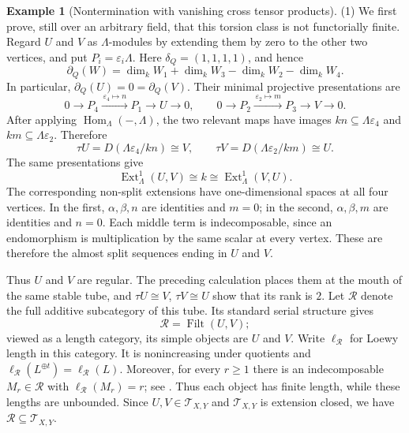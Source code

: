\documentclass[11pt,reqno]{amsart}
\theoremstyle{definition}
\newtheorem{example}[theorem]{Example}
\theoremstyle{remark}
\newcommand{\Ext}{\operatorname{Ext}}
\newcommand{\Hom}{\operatorname{Hom}}
\numberwithin{equation}{section}
\begin{document}
\begin{example}[Nontermination with vanishing cross tensor products]
\textup{(1)} We first prove, still over an arbitrary field, that this torsion
class is not functorially finite.  Regard $U$ and $V$ as $\Lambda$-modules by
extending them by zero to the other two vertices, and put
$P_i=\varepsilon_i\Lambda$.  Here $\delta_Q=(1,1,1,1)$, and hence
\[
 \partial_Q(W)=
 \dim_kW_1+\dim_kW_3-\dim_kW_2-\dim_kW_4.
\]
In particular, $\partial_Q(U)=0=\partial_Q(V)$.  Their minimal projective
presentations are
\[
 0\longrightarrow P_4\xrightarrow{\,\varepsilon_4\mapsto n\,}P_1
   \longrightarrow U\longrightarrow0,
 \qquad
 0\longrightarrow P_2\xrightarrow{\,\varepsilon_2\mapsto m\,}P_3
   \longrightarrow V\longrightarrow0.
\]
After applying $\Hom_\Lambda(-,\Lambda)$, the two relevant maps have images
$kn\subseteq\Lambda\varepsilon_4$ and
$km\subseteq\Lambda\varepsilon_2$.  Therefore
\[
 \tau U=D(\Lambda\varepsilon_4/kn)\cong V,
 \qquad
 \tau V=D(\Lambda\varepsilon_2/km)\cong U.
\]
The same presentations give
\[
 \Ext^1_\Lambda(U,V)\cong k
 \cong\Ext^1_\Lambda(V,U).
\]
The corresponding non-split extensions have one-dimensional spaces at all
four vertices.  In the first, $\alpha,\beta,n$ are identities and $m=0$;
in the second, $\alpha,\beta,m$ are identities and $n=0$.  Each middle term
is indecomposable, since an endomorphism is multiplication by the same scalar
at every vertex.  These are therefore the almost split sequences ending in
$U$ and $V$.

Thus $U$ and $V$ are regular.  The preceding calculation places them at the
mouth of the same stable tube, and
$\tau U\cong V$, $\tau V\cong U$ show that its rank is $2$.  Let
$\mathcal R$ denote the full additive subcategory of this tube.  Its standard
serial structure gives
\[
 \mathcal R=\operatorname{Filt}(U,V);
\]
viewed as a length category, its simple objects are $U$ and $V$.  Write
$\ell_{\mathcal R}$ for Loewy length in this category.  It is nonincreasing
under quotients and
$\ell_{\mathcal R}(L^{\oplus t})=\ell_{\mathcal R}(L)$.  Moreover, for every
$r\geq1$ there is an indecomposable $M_r\in\mathcal R$ with
$\ell_{\mathcal R}(M_r)=r$; see \cite[Section~3, Case~1]{Ringel}.
Thus each object has finite length, while these lengths are unbounded.  Since
$U,V\in\mathcal T_{X,Y}$ and $\mathcal T_{X,Y}$ is extension closed, we have
$\mathcal R\subseteq\mathcal T_{X,Y}$.


\end{example}
\end{document}
